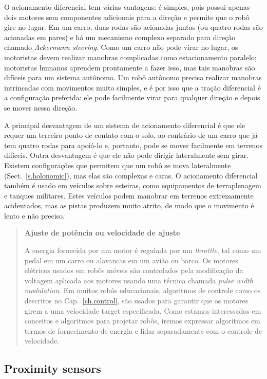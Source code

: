 O acionamento diferencial tem várias vantagens: é simples, pois possui apenas dois motores sem componentes adicionais para a direção e permite que o robô gire no lugar. Em um carro, duas rodas são acionadas juntas (ou quatro rodas são acionadas em pares) e há um mecanismo complexo separado para direção chamado \emph{Ackermann steering}. Como um carro não pode virar no lugar, os motoristas devem realizar manobras complicadas como estacionamento paralelo; motoristas humanos aprendem prontamente a fazer isso, mas tais manobras são difíceis para um sistema autônomo. Um robô autônomo precisa realizar manobras intrincadas com movimentos muito simples, e é por isso que a tração diferencial é a configuração preferida: ele pode facilmente virar para qualquer direção e depois se mover nessa direção.

A principal desvantagem de um sistema de acionamento diferencial é que ele requer um terceiro ponto de contato com o solo, ao contrário de um carro que já tem quatro rodas para apoiá-lo e, portanto, pode se mover facilmente em terrenos difíceis. Outra desvantagem é que ele não pode dirigir lateralmente sem girar. Existem configurações que permitem que um robô se mova lateralmente (Sect.~\ref{s.holonomic}), mas elas são complexas e caras. O acionamento diferencial também é usado em veículos sobre esteiras, como equipamentos de terraplenagem e tanques militares. Estes veículos podem manobrar em terrenos extremamente acidentados, mas as pistas produzem muito atrito, de modo que o movimento é lento e não preciso.

\begin{quote}
\begin{center}
\textbf{Ajuste de potência ou velocidade de ajuste}
\end{center}
A energia fornecida por um motor é regulada por um \emph{throttle}, tal como um pedal em um carro ou alavancas em um avião ou barco. Os motores elétricos usados em robôs móveis são controlados pela modificação da voltagem aplicada aos motores usando uma técnica chamada \emph{pulse width modulation}. Em muitos robôs educacionais, algoritmos de controle como os descritos no Cap.~\ref{ch.control}, são usados para garantir que os motores girem a uma velocidade {target especificada}. Como estamos interessados em conceitos e algoritmos para projetar robôs, iremos expressar algoritmos em termos de fornecimento de energia e lidar separadamente com o controle de velocidade.
\end{quote}

\subsection{Proximity sensors}

